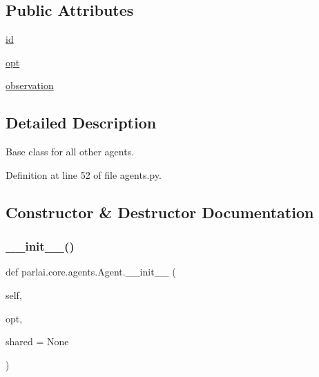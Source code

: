 \subsection*{Public Attributes}
\begin{DoxyCompactItemize}
\item 
\hyperlink{classparlai_1_1core_1_1agents_1_1Agent_ac00c13f4c7dd1263bf9203fa96dd2366}{id}
\item 
\hyperlink{classparlai_1_1core_1_1agents_1_1Agent_ab3b45d2754244608c75d4068b90cd051}{opt}
\item 
\hyperlink{classparlai_1_1core_1_1agents_1_1Agent_aedbecc4b4aa7af7413882a0429e0f1db}{observation}
\end{DoxyCompactItemize}


\subsection{Detailed Description}
\begin{DoxyVerb}Base class for all other agents.
\end{DoxyVerb}
 

Definition at line 52 of file agents.\+py.



\subsection{Constructor \& Destructor Documentation}
\mbox{\label{classparlai_1_1core_1_1agents_1_1Agent_aa7992ab392e2803607937e805ceb176f}} 
\subsubsection{\texorpdfstring{\+\_\+\+\_\+init\+\_\+\+\_\+()}{\_\_init\_\_()}}
{\footnotesize\ttfamily def parlai.\+core.\+agents.\+Agent.\+\_\+\+\_\+init\+\_\+\+\_\+ (\begin{DoxyParamCaption}\item[{}]{self,  }\item[{}]{opt,  }\item[{}]{shared = {\ttfamily None} }\end{DoxyParamCaption})}



